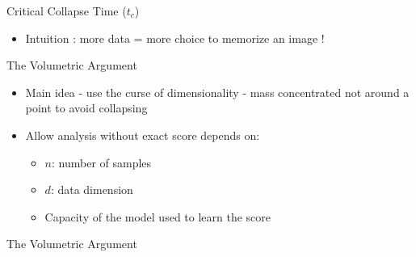 \documentclass[aspectratio=169]{beamer}
\begin{document}
\begin{frame}{Critical Collapse Time ($t_c$)}
\begin{itemize}
    \item Intuition : more data = more choice to memorize an image !
\end{itemize}
\begin{center}
    \end{center}
\end{frame}


\begin{frame}{The Volumetric Argument}
    \begin{itemize}
        \item Main idea - use the curse of dimensionality - mass concentrated not around a point to avoid collapsing
    
        \item Allow analysis without exact score depends on:
        \begin{itemize}
            \item $n$: number of samples
            \item $d$: data dimension
            \item Capacity of the model used to learn the score
        \end{itemize}
    \end{itemize}
\end{frame}

\begin{frame}{The Volumetric Argument}
    
    \begin{center}
    \end{center}
\end{frame}
\end{document}
